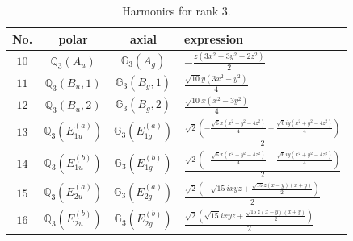 \documentclass[fleqn,8pt,landscape]{jsarticle}
\begin{document}
\begin{table}[ht!]
\begin{center}
\caption{Harmonics for rank 3.}
\renewcommand{\arraystretch}{1.3}
\begin{tabular}{cccl} \hline \hline
No. & polar & axial & expression \\ \hline
$ 10 $ & $ \mathbb{Q}_{3}(A_{u}) $ & $ \mathbb{G}_{3}(A_{g}) $ & $ - \frac{z \left(3 x^{2} + 3 y^{2} - 2 z^{2}\right)}{2} $ \\
$ 11 $ & $ \mathbb{Q}_{3}(B_{u},1) $ & $ \mathbb{G}_{3}(B_{g},1) $ & $ \frac{\sqrt{10} y \left(3 x^{2} - y^{2}\right)}{4} $ \\
$ 12 $ & $ \mathbb{Q}_{3}(B_{u},2) $ & $ \mathbb{G}_{3}(B_{g},2) $ & $ \frac{\sqrt{10} x \left(x^{2} - 3 y^{2}\right)}{4} $ \\
$ 13 $ & $ \mathbb{Q}_{3}(E_{1u}^{(a)}) $ & $ \mathbb{G}_{3}(E_{1g}^{(a)}) $ & $ \frac{\sqrt{2} \left(- \frac{\sqrt{6} x \left(x^{2} + y^{2} - 4 z^{2}\right)}{4} - \frac{\sqrt{6} i y \left(x^{2} + y^{2} - 4 z^{2}\right)}{4}\right)}{2} $ \\
$ 14 $ & $ \mathbb{Q}_{3}(E_{1u}^{(b)}) $ & $ \mathbb{G}_{3}(E_{1g}^{(b)}) $ & $ \frac{\sqrt{2} \left(- \frac{\sqrt{6} x \left(x^{2} + y^{2} - 4 z^{2}\right)}{4} + \frac{\sqrt{6} i y \left(x^{2} + y^{2} - 4 z^{2}\right)}{4}\right)}{2} $ \\
$ 15 $ & $ \mathbb{Q}_{3}(E_{2u}^{(a)}) $ & $ \mathbb{G}_{3}(E_{2g}^{(a)}) $ & $ \frac{\sqrt{2} \left(- \sqrt{15} i x y z + \frac{\sqrt{15} z \left(x - y\right) \left(x + y\right)}{2}\right)}{2} $ \\
$ 16 $ & $ \mathbb{Q}_{3}(E_{2u}^{(b)}) $ & $ \mathbb{G}_{3}(E_{2g}^{(b)}) $ & $ \frac{\sqrt{2} \left(\sqrt{15} i x y z + \frac{\sqrt{15} z \left(x - y\right) \left(x + y\right)}{2}\right)}{2} $ \\
 \hline \hline
\end{tabular}
\end{center}
\end{table}
\end{document}
